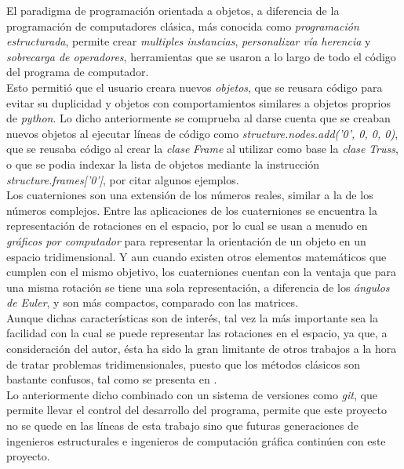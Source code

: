 El paradigma de programación orientada a objetos, a diferencia de la programación de computadores clásica, más conocida como \textit{programación estructurada}, permite crear \textit{multiples instancias}, \textit{personalizar vía herencia} y \textit{sobrecarga de operadores}, herramientas que se usaron a lo largo de todo el código del programa de computador. \\

Esto permitió que el usuario creara nuevos \textit{objetos}, que se reusara código para evitar su duplicidad y objetos con comportamientos similares a objetos proprios de \textit{python}. Lo dicho anteriormente se comprueba al darse cuenta que se creaban nuevos objetos al ejecutar líneas de código como \textit{structure.nodes.add('0', 0, 0, 0)}, que se reusaba código al crear la \textit{clase} \textit{Frame} al utilizar como base la \textit{clase} \textit{Truss}, o que se podia indexar la lista de objetos mediante la instrucción \textit{structure.frames['0']}, por citar algunos ejemplos.  \\

Los cuaterniones son una extensión de los números reales, similar a la de los números complejos. Entre las aplicaciones de los cuaterniones se encuentra la representación de rotaciones en el espacio, por lo cual se usan a menudo en \textit{gráficos por computador} para representar la orientación de un objeto en un espacio tridimensional. Y aun cuando existen otros elementos matemáticos que cumplen con el mismo objetivo, los cuaterniones cuentan con la ventaja que para una misma rotación se tiene una sola representación, a diferencia de los \textit{ángulos de Euler}, y son más compactos, comparado con las matrices. \\

Aunque dichas características son de interés, tal vez la más importante sea la facilidad con la cual se puede representar las rotaciones en el espacio, ya que, a consideración del autor, ésta ha sido la gran limitante de otros trabajos a la hora de tratar problemas tridimensionales, puesto que los métodos clásicos son bastante confusos, tal como se presenta en \cite{escamilla1995microcomputadores}. \\

Lo anteriormente dicho combinado con un sistema de versiones como \textit{git}, que permite llevar el control del desarrollo del programa, permite que este proyecto no se quede en las líneas de esta trabajo sino que futuras generaciones de ingenieros estructurales e ingenieros de computación gráfica continúen con este proyecto. \\


